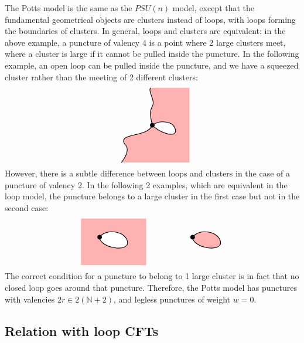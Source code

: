 \documentclass[12pt, a4paper]{article}
\begin{document}
The Potts model is the same as the $PSU(n)$ model, except that the fundamental geometrical objects are clusters instead of loops, with loops forming the boundaries of clusters. In general, loops and clusters are equivalent: in the above example, a puncture of valency 4 is a point where 2 large clusters meet, where a cluster is large if it cannot be pulled inside the puncture. In the following example, an open loop can be pulled inside the puncture, and we have a squeezed cluster rather than the meeting of 2 different clusters:
\begin{align}
 \begin{tikzpicture}[baseline=(current  bounding  box.center), scale = .4]
  \clip (-4, -4) rectangle (4, 4);
  \filldraw[thick, fill = red!30] (0, 0) to [out = 100, in = -120] (0, 2) to [out = 60, in = -150] (0, 4.2) -- (4.2, 4.2) -- (4.2, -4.2) -- (-3.5, -4.2) to [out = 50, in = -40] (-3, -2) to [out = 120, in = -110] (0, 0) to [out = -50, in = -80] (2.5, -.5) to [out = 100, in = 35] (0, 0);
   \draw (0, 0) node[fill, circle, minimum size = 2mm, inner sep = 0]{};
 \end{tikzpicture}
\end{align}
However, there is a subtle difference between loops and clusters in the case of a puncture of valency 2. In the following 2 examples, which are equivalent in the loop model, the puncture belongs to a large cluster in the first case but not in the second case:
\begin{align}
 \begin{tikzpicture}[baseline=(current  bounding  box.center), scale = .4]
  \fill[red!30] (-2, -3) rectangle (5, 2);
  \filldraw[thick, fill = white] (0, 0) to [out = -90, in = -80] (3, -.5) to [out = 100, in = 55] (0, 0);
   \draw (0, 0) node[fill, circle, minimum size = 2mm, inner sep = 0]{};
   \filldraw[thick, fill = red!30] (10, 0) to [out = -90, in = -80] (13, -.5) to [out = 100, in = 55] (10, 0);
   \draw (10, 0) node[fill, circle, minimum size = 2mm, inner sep = 0]{};
 \end{tikzpicture}
\end{align}
The correct condition for a puncture to belong to 1 large cluster is in fact that no closed loop goes around that puncture. 
Therefore, the Potts model has punctures with valencies $2r\in 2(\mathbb{N}+2)$, and legless punctures of weight $w=0$.


\subsection{Relation with loop CFTs}
\end{document}
